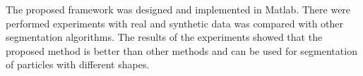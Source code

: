 \documentclass{lutmscthesis}[2010/09/22]
\begin{document}
The proposed framework was designed and implemented in Matlab. There were performed experiments with real and synthetic data was compared with other segmentation algorithms. The results of the experiments showed that the proposed method is better than other methods and can be used for segmentation of particles with different shapes.

\clearpage

%





 

%
\end{document}
